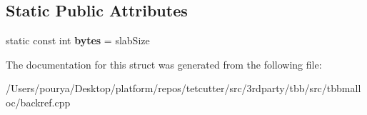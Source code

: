 \subsection*{Static Public Attributes}
\begin{DoxyCompactItemize}
\item 
\hypertarget{structrml_1_1internal_1_1BackRefBlock_a8091cca7a466952f3c3ad16aaaea583c}{}static const int {\bfseries bytes} = slab\+Size\label{structrml_1_1internal_1_1BackRefBlock_a8091cca7a466952f3c3ad16aaaea583c}

\end{DoxyCompactItemize}


The documentation for this struct was generated from the following file\+:\begin{DoxyCompactItemize}
\item 
/\+Users/pourya/\+Desktop/platform/repos/tetcutter/src/3rdparty/tbb/src/tbbmalloc/backref.\+cpp\end{DoxyCompactItemize}
